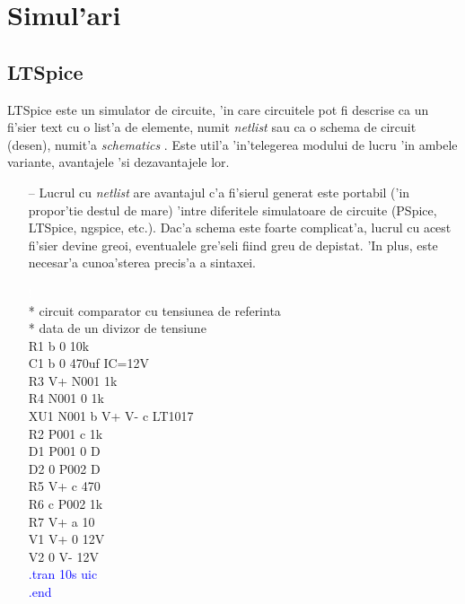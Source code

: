 \section{Simul'ari}

\subsection*{LTSpice}

LTSpice este un simulator de circuite, 'in care circuitele pot fi descrise ca un fi'sier text cu o list'a de elemente, numit \textit{netlist} sau ca o schema de circuit (desen), numit'a \textit{schematics} \cite{ltspice}. Este util'a 'in'telegerea modului de lucru 'in ambele variante, avantajele 'si dezavantajele lor.

 \begin{itemize}
 \item[--] Lucrul cu \textit{netlist} are avantajul c'a fi'sierul generat este portabil ('in propor'tie destul de mare) 'intre diferitele simulatoare de circuite (PSpice, LTSpice, ngspice, etc.). Dac'a schema este foarte complicat'a, lucrul cu acest fi'sier devine greoi, eventualele gre'seli fiind greu de depistat. 'In plus, este necesar'a cunoa'sterea precis'a a sintaxei. 
 \begin{example}
\textcolor{white}{!}\\
\textcolor{OliveGreen}{* circuit comparator cu tensiunea de referinta}\\
\textcolor{OliveGreen}{* data de un divizor de tensiune}\\
R1 b 0 10k \\
C1 b 0 470uf IC=12V \\
R3 V+ N001 1k \\
R4 N001 0 1k \\
XU1 N001 b V+ V- c LT1017 \\
R2 P001 c 1k \\
D1 P001 0 D \\
D2 0 P002 D \\
R5 V+ c 470 \\
R6 c P002 1k \\
R7 V+ a 10\\
V1 V+ 0 12V\\ 
V2 0 V- 12V \\
\textcolor{blue}{.tran 10s uic} \\
\textcolor{blue}{.end}\\
\end{example} 


\end{itemize}
